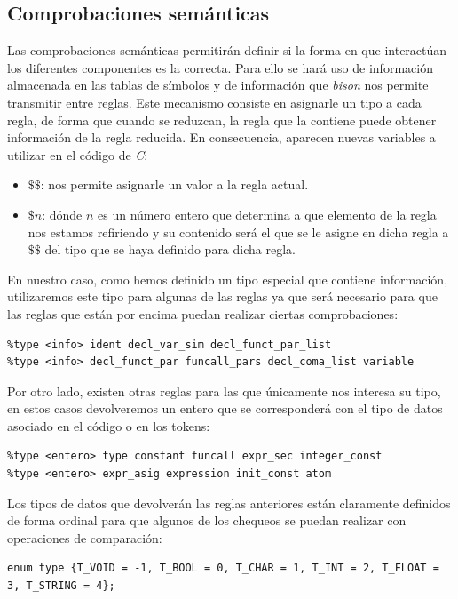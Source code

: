 \documentclass[a4paper,10pt]{article}
\begin{document}
\subsection{Comprobaciones semánticas}

Las comprobaciones semánticas permitirán definir si la forma en que interactúan los diferentes componentes es la correcta. Para ello se hará uso de información almacenada en las tablas de símbolos y de información que \textit{bison} nos permite transmitir entre reglas. Este mecanismo consiste en asignarle un tipo a cada regla, de forma que cuando se reduzcan, la regla que la contiene puede obtener información de la regla reducida. En consecuencia, aparecen nuevas variables a utilizar en el código de \textit{C}:

\begin{itemize}
	\item $\$\$$: nos permite asignarle un valor a la regla actual.
	\item $\$n$: dónde $n$ es un número entero que determina a que elemento de la regla nos estamos refiriendo y su contenido será el que se le asigne en dicha regla a $\$\$$ del tipo que se haya definido para dicha regla.
\end{itemize}

En nuestro caso, como hemos definido un tipo especial que contiene información, utilizaremos este tipo para algunas de las reglas ya que será necesario para que las reglas que están por encima puedan realizar ciertas comprobaciones:

\begin{lstlisting}
%type <info> ident decl_var_sim decl_funct_par_list 
%type <info> decl_funct_par funcall_pars decl_coma_list variable
\end{lstlisting}

Por otro lado, existen otras reglas para las que únicamente nos interesa su tipo, en estos casos devolveremos un entero que se corresponderá con el tipo de datos asociado en el código o en los tokens:
\begin{lstlisting}
%type <entero> type constant funcall expr_sec integer_const
%type <entero> expr_asig expression init_const atom
\end{lstlisting}

Los tipos de datos que devolverán las reglas anteriores están claramente definidos de forma ordinal para que algunos de los chequeos se puedan realizar con operaciones de comparación:

\begin{lstlisting}
enum type {T_VOID = -1, T_BOOL = 0, T_CHAR = 1, T_INT = 2, T_FLOAT = 3, T_STRING = 4};
\end{lstlisting}
\end{document}
